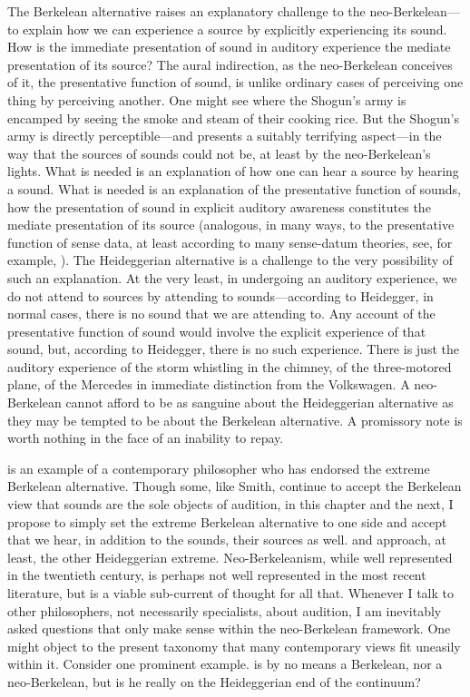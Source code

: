 The Berkelean alternative raises an explanatory challenge to the neo-Berkelean---\-to explain how we can experience a source by explicitly experiencing its sound. How is the immediate presentation of sound in auditory experience the mediate presentation of its source? The aural indirection, as the neo-Berkelean conceives of it, the presentative function of sound, is unlike ordinary cases of perceiving one thing by perceiving another. One might see where the Shogun's army is encamped by seeing the smoke and steam of their cooking rice. But the Shogun's army is directly perceptible---and presents a suitably terrifying aspect---in the way that the sources of sounds could not be, at least by the neo-Berkelean's lights. What is needed is an explanation of how one can hear a source by hearing a sound. What is needed is an explanation of the presentative function of sounds, how the presentation of sound in explicit auditory awareness constitutes the mediate presentation of its source (analogous, in many ways, to the presentative function of sense data, at least according to many sense-datum theories, see, for example, \citealt{Price:1932fk}). The Heideggerian alternative is a challenge to the very possibility of such an explanation. At the very least, in undergoing an auditory experience, we do not attend to sources by attending to sounds---according to Heidegger, in normal cases, there is no sound that we are attending to. Any account of the presentative function of sound would involve the explicit experience of that sound, but, according to Heidegger, there is no such experience. There is just the auditory experience of the storm whistling in the chimney, of the three-motored plane, of the Mercedes in immediate distinction from the Volkswagen. A neo-Berkelean cannot afford to be as sanguine about the Heideggerian alternative as they may be tempted to be about the Berkelean alternative. A promissory note is worth nothing in the face of an inability to repay.

\citet{Smith:2002sa} is an example of a contemporary philosopher who has endorsed the extreme Berkelean alternative. Though some, like Smith, continue to accept the Berkelean view that sounds are the sole objects of audition, in this chapter and the next, I propose to simply set the extreme Berkelean alternative to one side and accept that we hear, in addition to the sounds, their sources as well.  \citet{Leddington:2014aa} and \citet{Nudds:2010aa} approach, at least, the other Heideggerian extreme. Neo-Berkeleanism, while well represented in the twentieth century, is perhaps not well represented in the most recent literature, but is a viable sub-current of thought for all that. Whenever I talk to other philosophers, not necessarily specialists, about audition, I am inevitably asked questions that only make sense within the neo-Berkelean framework. One might object to the present taxonomy that many contemporary views fit uneasily within it. Consider one prominent example. \citet{OCallaghan:2007xy,OCallaghan:2009aa} is by no means a Berkelean, nor a neo-Berkelean, but is he really on the Heideggerian end of the continuum? 

